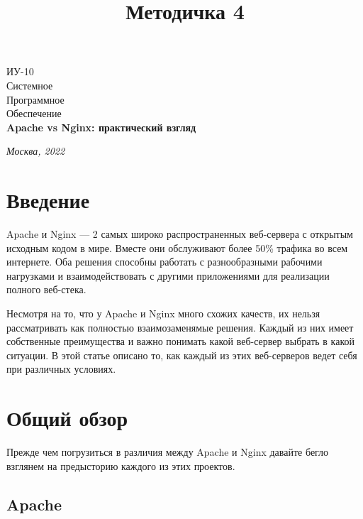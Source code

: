 \documentclass[14pt, a4paper]{article}
\title{Методичка 4}
\begin{document}
\begin{titlepage}
    \topmargin=216pt
    \newpage
    \hangindent=0.7cm
    \huge ИУ-10\\
    Системное\\
    Программное\\
    Обеспечение\\
    \textbf{Apache vs Nginx: практический взгляд}

    \vspace{10cm}

    \begin{center}
        \small\textit{Москва, 2022}
    \end{center}
\end{titlepage}


\tableofcontents
\newpage




\section*{Введение}

Apache и Nginx — 2 самых широко распространенных веб-сервера с открытым исходным кодом в мире. 
Вместе они обслуживают более 50\% трафика во всем интернете. Оба решения способны работать с 
разнообразными рабочими нагрузками и взаимодействовать с другими приложениями для реализации полного веб-стека.

Несмотря на то, что у Apache и Nginx много схожих качеств, их нельзя рассматривать как полностью 
взаимозаменямые решения. Каждый из них имеет собственные преимущества и важно понимать какой веб-сервер 
выбрать в какой ситуации. В этой статье описано то, как каждый из этих веб-серверов ведет себя при различных условиях.\\



\section*{Общий обзор}
Прежде чем погрузиться в различия между Apache и Nginx давайте бегло взглянем на предысторию каждого из этих проектов.\\



\subsection*{Apache}
\end{document}
